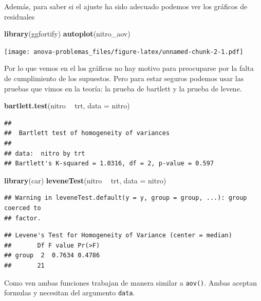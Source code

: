 \documentclass[]{book}
\newenvironment{Shaded}{\begin{snugshade}}{\end{snugshade}}
\newcommand{\DataTypeTok}[1]{\textcolor[rgb]{0.13,0.29,0.53}{#1}}
\newcommand{\KeywordTok}[1]{\textcolor[rgb]{0.13,0.29,0.53}{\textbf{#1}}}
\newcommand{\NormalTok}[1]{#1}
\newcommand{\OperatorTok}[1]{\textcolor[rgb]{0.81,0.36,0.00}{\textbf{#1}}}
\newcommand{\StringTok}[1]{\textcolor[rgb]{0.31,0.60,0.02}{#1}}
\theoremstyle{definition}
\theoremstyle{definition}
\theoremstyle{definition}
\theoremstyle{remark}
\begin{document}
Además, para saber si el ajuste ha sido adecuado podemos ver los
gráficos de residuales

\begin{Shaded}
\begin{Highlighting}[]
\KeywordTok{library}\NormalTok{(ggfortify)}
\KeywordTok{autoplot}\NormalTok{(nitro_aov)}
\end{Highlighting}
\end{Shaded}

\texttt{[image: anova-problemas\_files/figure-latex/unnamed-chunk-2-1.pdf]}

Por lo que vemos en el los gráficos no hay motivo para preocuparse por
la falta de cumplimiento de los supuestos. Pero para estar seguros
podemos usar las pruebas que vimos en la teoría: la prueba de bartlett y
la prueba de levene.

\begin{Shaded}
\begin{Highlighting}[]
\KeywordTok{bartlett.test}\NormalTok{(nitro }\OperatorTok{~}\StringTok{ }\NormalTok{trt, }\DataTypeTok{data =}\NormalTok{ nitro)}
\end{Highlighting}
\end{Shaded}

\begin{verbatim}
## 
##  Bartlett test of homogeneity of variances
## 
## data:  nitro by trt
## Bartlett's K-squared = 1.0316, df = 2, p-value = 0.597
\end{verbatim}

\begin{Shaded}
\begin{Highlighting}[]
\KeywordTok{library}\NormalTok{(car)}
\KeywordTok{leveneTest}\NormalTok{(nitro }\OperatorTok{~}\StringTok{ }\NormalTok{trt, }\DataTypeTok{data =}\NormalTok{ nitro)}
\end{Highlighting}
\end{Shaded}

\begin{verbatim}
## Warning in leveneTest.default(y = y, group = group, ...): group coerced to
## factor.
\end{verbatim}

\begin{verbatim}
## Levene's Test for Homogeneity of Variance (center = median)
##       Df F value Pr(>F)
## group  2  0.7634 0.4786
##       21
\end{verbatim}

Como ven ambas funciones trabajan de manera similar a \texttt{aov()}.
Ambas aceptan formulas y necesitan del argumento \texttt{data}.
\end{document}
